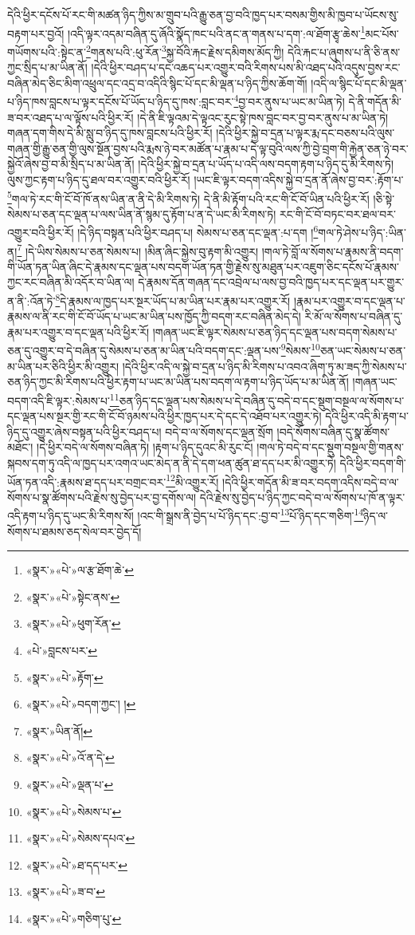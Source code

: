 དེའི་ཕྱིར་དངོས་པོ་རང་གི་མཚན་ཉིད་ཀྱིས་མ་གྲུབ་པའི་རྒྱུ་ཅན་བྱ་བའི་ཁྱད་པར་བསམ་གྱིས་མི་ཁྱབ་པ་ཡོངས་སུ་བརྟག་པར་བྱའོ། །འདི་ལྟར་འདམ་བཞིན་དུ་ཞོའི་སྣོད་ཁང་པའི་ནང་ན་གནས་པ་དག་:ལ་ཐོག་རྩྭ་ཆེས་\footnote{«སྣར་»«པེ་»ལ་རྩ་ཐོག་ཆེ་}མང་པོས་གཡོགས་པའི་:སྟེང་ན་\footnote{«སྣར་»«པེ་»སྟེང་ནས་}གནས་པའི་:ཕུ་རོན་\footnote{«སྣར་»«པེ་»ཕུག་རོན་}སྐྱ་བོའི་རྐང་རྗེས་དམིགས་མོད་ཀྱི། དེའི་རྐང་པ་ཞུགས་པ་ནི་ཅི་ནས་ཀྱང་སྲིད་པ་མ་ཡིན་ནོ། །དེའི་ཕྱིར་བཤད་པ་དང་འཆད་པར་འགྱུར་བའི་རིགས་པས་མི་འཐད་པའི་འདུས་བྱས་རང་བཞིན་མེད་ཅིང་མིག་འཕྲུལ་དང་འདྲ་བ་འདིའི་སྙིང་པོ་དང་མི་ལྡན་པ་ཉིད་ཀྱིས་ཆོག་གོ། །འདི་ལ་སྙིང་པོ་དང་མི་ལྡན་པ་ཉིད་ཁས་བླངས་པ་ལྟར་དངོས་པོ་ཡོད་པ་ཉིད་དུ་ཁས་:བླང་བར་\footnote{«པེ་»བླངས་པར་}བྱ་བར་ནུས་པ་ཡང་མ་ཡིན་ཏེ། དེ་ནི་གདོན་མི་ཟ་བར་འཐད་པ་ལ་ལྟོས་པའི་ཕྱིར་རོ། །དེ་ནི་ཇི་ལྟའམ་དེ་ལྟའང་རུང་སྟེ་ཁས་བླང་བར་བྱ་བར་ནུས་པ་མ་ཡིན་ཏེ། གཞན་དག་གིས་དེ་མི་སླུ་བ་ཉིད་དུ་ཁས་བླངས་པའི་ཕྱིར་རོ། །དེའི་ཕྱིར་སྐྱེ་བ་དྲན་པ་ལྟར་རྨ་དང་བཅས་པའི་ལུས་གཞན་གྱི་རྒྱུ་ཅན་གྱི་ལུས་སྔོན་བྱས་པའི་རྨས་ཉེ་བར་མཚོན་པ་རྣམ་པ་དེ་ལྟ་བུའི་ལས་ཀྱི་བྱེ་བྲག་གི་རྐྱེན་ཅན་ཉེ་བར་སྐྱེའོ་ཞེས་བྱ་བ་མི་སྲིད་པ་མ་ཡིན་ནོ། །དེའི་ཕྱིར་སྐྱེ་བ་དྲན་པ་ཡོད་པ་འདི་ལས་བདག་རྟག་པ་ཉིད་དུ་མི་རིགས་ཏེ། ལུས་ཀྱང་རྟག་པ་ཉིད་དུ་ཐལ་བར་འགྱུར་བའི་ཕྱིར་རོ། །ཡང་ཇི་ལྟར་བདག་འདིས་སྐྱེ་བ་དྲན་ནོ་ཞེས་བྱ་བར་:རྟོག་པ་\footnote{«སྣར་»«པེ་»རྟོག་}གལ་ཏེ་རང་གི་ངོ་བོ་ཁོ་ནས་ཡིན་ན་ནི་དེ་མི་རིགས་ཏེ། དེ་ནི་མི་རྟོག་པའི་རང་གི་ངོ་བོ་ཡིན་པའི་ཕྱིར་རོ། །ཅི་སྟེ་སེམས་པ་ཅན་དང་ལྡན་པ་ལས་ཡིན་ནོ་སྙམ་དུ་རྟོག་པ་ན་དེ་ཡང་མི་རིགས་ཏེ། རང་གི་ངོ་བོ་བཏང་བར་ཐལ་བར་འགྱུར་བའི་ཕྱིར་རོ། །དེ་ཉིད་བསྟན་པའི་ཕྱིར་བཤད་པ། སེམས་པ་ཅན་དང་ལྡན་:པ་དག །\footnote{«སྣར་»«པེ་»བདག་ཀྱང་། །}གལ་ཏེ་ཤེས་པ་ཉིད་:ཡིན་ན།\footnote{«སྣར་»ཡིན་ནོ།} །དེ་ཡིས་སེམས་པ་ཅན་སེམས་པ། །མིན་ཞིང་སྐྱེས་བུ་རྟག་མི་འགྱུར། །གལ་ཏེ་བློ་ལ་སོགས་པ་རྣམས་ནི་བདག་གི་ཡོན་ཏན་ཡིན་ཞིང་དེ་རྣམས་དང་ལྡན་པས་བདག་ཡོན་ཏན་གྱི་རྗེས་སུ་མཐུན་པར་འཇུག་ཅིང་དངོས་པོ་རྣམས་ཀྱང་རང་བཞིན་མི་འདོར་བ་ཡིན་ལ། དེ་རྣམས་དོན་གཞན་དང་འབྲེལ་པ་ལས་བྱ་བའི་ཁྱད་པར་དང་ལྡན་པར་གྱུར་ན་ནི་:འོན་ཏེ་\footnote{«སྣར་»«པེ་»འོ་ན་དེ་}དེ་རྣམས་ལ་ཁྱད་པར་སྔར་ཡོད་པ་མ་ཡིན་པར་རྣམ་པར་འགྱུར་རོ། །རྣམ་པར་འགྱུར་བ་དང་ལྡན་པ་རྣམས་ལ་ནི་རང་གི་ངོ་བོ་ཡོད་པ་ཡང་མ་ཡིན་པས་ཁྱོད་ཀྱི་བདག་རང་བཞིན་མེད་དེ། རི་མོ་ལ་སོགས་པ་བཞིན་དུ་རྣམ་པར་འགྱུར་བ་དང་ལྡན་པའི་ཕྱིར་རོ། །གཞན་ཡང་ཇི་ལྟར་སེམས་པ་ཅན་ཉིད་དང་ལྡན་པས་བདག་སེམས་པ་ཅན་དུ་འགྱུར་བ་དེ་བཞིན་དུ་སེམས་པ་ཅན་མ་ཡིན་པའི་བདག་དང་:ལྡན་པས་\footnote{«སྣར་»«པེ་»ལྡན་པ་}སེམས་\footnote{«སྣར་»«པེ་»སེམས་པ་}ཅན་ཡང་སེམས་པ་ཅན་མ་ཡིན་པར་ཅིའི་ཕྱིར་མི་འགྱུར། །དེའི་ཕྱིར་འདི་ལ་སྐྱེ་བ་དྲན་པ་ཉིད་མི་རིགས་པ་འབའ་ཞིག་ཏུ་མ་ཟད་ཀྱི་སེམས་པ་ཅན་ཉིད་ཀྱང་མི་རིགས་པའི་ཕྱིར་རྟག་པ་ཡང་མ་ཡིན་པས་བདག་ལ་རྟག་པ་ཉིད་ཡོད་པ་མ་ཡིན་ནོ། །གཞན་ཡང་བདག་འདི་ཇི་ལྟར་:སེམས་པ་\footnote{«སྣར་»«པེ་»སེམས་དཔའ་}ཅན་ཉིད་དང་ལྡན་པས་སེམས་པ་དེ་བཞིན་དུ་བདེ་བ་དང་སྡུག་བསྔལ་ལ་སོགས་པ་དང་ལྡན་པས་སྔར་གྱི་རང་གི་ངོ་བོ་ཉམས་པའི་ཕྱིར་ཁྱད་པར་དེ་དང་དེ་འཐོབ་པར་འགྱུར་ཏེ། དེའི་ཕྱིར་འདི་མི་རྟག་པ་ཉིད་དུ་འགྱུར་ཞེས་བསྟན་པའི་ཕྱིར་བཤད་པ། བདེ་བ་ལ་སོགས་དང་ལྡན་སྲོག །བདེ་སོགས་བཞིན་དུ་སྣ་ཚོགས་མཐོང་། །དེ་ཕྱིར་བདེ་ལ་སོགས་བཞིན་ཏེ། །རྟག་པ་ཉིད་དུའང་མི་རུང་ངོ། །གལ་ཏེ་བདེ་བ་དང་སྡུག་བསྔལ་གྱི་གནས་སྐབས་དག་ཏུ་འདི་ལ་ཁྱད་པར་འགའ་ཡང་མེད་ན་ནི་དེ་དག་ཕན་ཚུན་ཐ་དད་པར་མི་འགྱུར་ཏེ། དེའི་ཕྱིར་བདག་གི་ཡོན་ཏན་འདི་:རྣམས་ཐ་དད་པར་བགྲང་བར་\footnote{«སྣར་»«པེ་»ཐ་དད་པར་}མི་འགྱུར་རོ། །དེའི་ཕྱིར་གདོན་མི་ཟ་བར་བདག་འདིས་བདེ་བ་ལ་སོགས་པ་སྣ་ཚོགས་པའི་རྗེས་སུ་བྱེད་པར་བྱ་དགོས་ལ། དེའི་རྗེས་སུ་བྱེད་པ་ཉིད་ཀྱང་བདེ་བ་ལ་སོགས་པ་ཁོ་ན་ལྟར་འདི་རྟག་པ་ཉིད་དུ་ཡང་མི་རིགས་སོ། །འང་གི་སྒྲས་ནི་བྱེད་པ་པོ་ཉིད་དང་:བྱ་བ་\footnote{«སྣར་»«པེ་»ཟ་བ་}པོ་ཉིད་དང་གཅིག་\footnote{«སྣར་»«པེ་»གཅིག་པུ་}ཉིད་ལ་སོགས་པ་ཐམས་ཅད་སེལ་བར་བྱེད་དོ། 